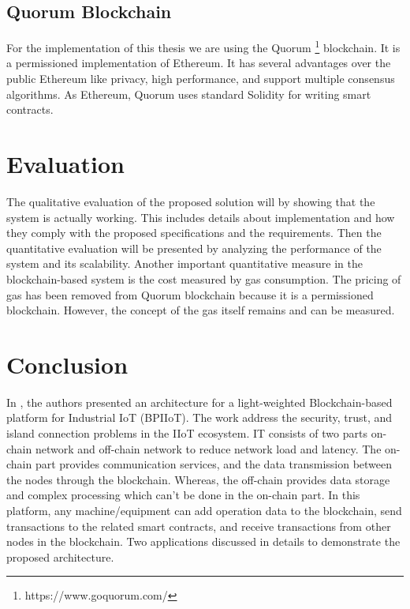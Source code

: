 \documentclass[runningheads]{llncs}
\begin{document}
\subsection{Quorum Blockchain}
For the implementation of this thesis we are using the Quorum \footnote{https://www.goquorum.com/} blockchain. It is a permissioned implementation of Ethereum. It has several advantages over the public Ethereum like privacy, high performance, and support multiple consensus algorithms. As Ethereum, Quorum uses standard Solidity for writing smart contracts.

\section{Evaluation}
The qualitative evaluation of the proposed solution will by showing that the system is actually working. This includes details about implementation and how they comply with the proposed specifications and the requirements. Then the quantitative evaluation will be presented by analyzing the performance of the system and its scalability. Another important quantitative measure in the blockchain-based system is the cost measured by gas consumption. The pricing of gas has been removed from Quorum blockchain because it is a permissioned blockchain. However, the concept of the gas itself remains and can be measured. 

\section{Conclusion}


\newpage
\noindent  In \cite{Bai2019}, the authors presented an architecture for a light-weighted Blockchain-based platform for Industrial IoT (BPIIoT). The work address the security, trust, and island connection problems in the IIoT ecosystem. IT consists of two parts on-chain network and off-chain network to reduce network load and latency. The on-chain part provides communication services, and the data transmission between the nodes through the blockchain. Whereas, the off-chain provides data storage and complex processing which can't be done in the on-chain part. In this platform, any machine/equipment can add operation data to the blockchain, send transactions to the related smart contracts, and receive transactions from other nodes in the blockchain. Two applications discussed in details to demonstrate the proposed architecture.
\bigbreak 
\end{document}
